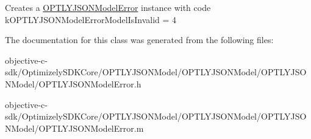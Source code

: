 Creates a \mbox{\hyperlink{interface_o_p_t_l_y_j_s_o_n_model_error}{O\+P\+T\+L\+Y\+J\+S\+O\+N\+Model\+Error}} instance with code k\+O\+P\+T\+L\+Y\+J\+S\+O\+N\+Model\+Error\+Model\+Is\+Invalid = 4 

The documentation for this class was generated from the following files\+:\begin{DoxyCompactItemize}
\item 
objective-\/c-\/sdk/\+Optimizely\+S\+D\+K\+Core/\+O\+P\+T\+L\+Y\+J\+S\+O\+N\+Model/\+O\+P\+T\+L\+Y\+J\+S\+O\+N\+Model/\+O\+P\+T\+L\+Y\+J\+S\+O\+N\+Model/O\+P\+T\+L\+Y\+J\+S\+O\+N\+Model\+Error.\+h\item 
objective-\/c-\/sdk/\+Optimizely\+S\+D\+K\+Core/\+O\+P\+T\+L\+Y\+J\+S\+O\+N\+Model/\+O\+P\+T\+L\+Y\+J\+S\+O\+N\+Model/\+O\+P\+T\+L\+Y\+J\+S\+O\+N\+Model/O\+P\+T\+L\+Y\+J\+S\+O\+N\+Model\+Error.\+m\end{DoxyCompactItemize}
